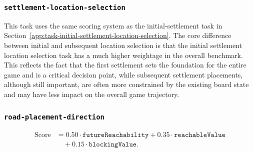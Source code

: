 \documentclass[letter,  12 pt]{article}
\begin{document}
\subsubsection{\texttt{settlement-location-selection}}
\label{app:task-settlement-location-selection}
This task uses the same scoring system as the initial-settlement task in Section~\ref{app:task-initial-settlement-location-selection}.
The core difference between initial and subsequent location selection is that the initial settlement location selection task has a much higher weightage in the overall benchmark.
This reflects the fact that the first settlement sets the foundation for the entire game and is a critical decision point, while subsequent settlement placements, although still important, are often more constrained by the existing board state and may have less impact on the overall game trajectory.

\subsubsection{\texttt{road-placement-direction}}
\label{app:task-road-placement-direction}
\[
\begin{aligned}
\text{Score} &=
0.50 \cdot \texttt{futureReachability}
+ 0.35 \cdot \texttt{reachableValue} \\
&\quad + 0.15 \cdot \texttt{blockingValue}.
\end{aligned}
\]
\end{document}

